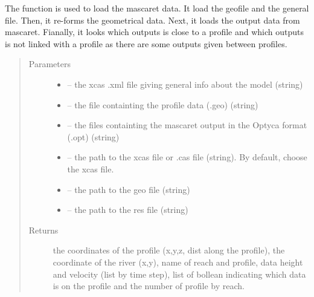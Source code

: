 \documentclass[letterpaper,10pt,english]{sphinxmanual}
\begin{document}
\begin{fulllineitems}
\label{\detokenize{index:src.mascaret.load_mascaret}}
The function is used to load the mascaret data. It load the geofile and the general file. Then, it re-forms the
geometrical data. Next, it loads the output data from mascaret. Fianally, it looks which outputs is close to
a profile and which outputs is not linked with a profile as there are some outputs given between profiles.
\begin{quote}\begin{description}
\item[{Parameters}] \leavevmode\begin{itemize}
\item {} 
 -- the xcas .xml file giving general info about the model (string)

\item {} 
 -- the file containting the profile data (.geo) (string)

\item {} 
 -- the files containting the mascaret output in the Optyca format (.opt) (string)

\item {} 
 -- the path to the xcas file or .cas file (string). By default, choose the xcas file.

\item {} 
 -- the path to the geo file (string)

\item {} 
 -- the path to the res file (string)

\end{itemize}

\item[{Returns}] \leavevmode
the coordinates of the profile (x,y,z, dist along the profile), the coordinate of the river (x,y), name of
reach and profile, data height and velocity (list by time step), list of bollean indicating which data is
on the profile and the number of profile by reach.

\end{description}\end{quote}

\end{fulllineitems}
\end{document}
